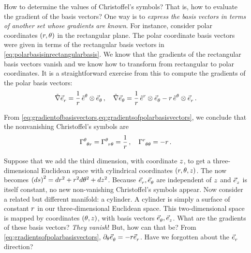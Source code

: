 How to determine the values of Christoffel's symbols? That is, how to evaluate the gradient of the basis vectors? One way is to \emph{express the basis vectors in terms of another set whose gradients are known}. For instance, consider polar coordinates $\tuple{\cxpos,\cypos}$ in the rectangular plane. The polar coordinate basis vectors were given in terms of the rectangular basis vectors in \cref{eq:polarbasisinrectangularbasis}. We know that the gradients of the rectangular basis vectors vanish and we know how to transform from rectangular to polar coordinates. It is a straightforward exercise from this to compute the gradients of the polar basis vectors:
%
\begin{equation}\label{eq:gradientsofpolarbasisvectors}
  \gradcov\tbvec\cxpos = \dfrac{1}{\cxpos}\,\tbcov\cypos\tprod\tbvec\cypos\,,\quad
  \gradcov\tbvec\cypos = \dfrac{1}{\cxpos}\,\tbcov\cxpos\tprod\tbvec\cypos 
                        - \cxpos\,\tbcov\cypos\tprod\tbvec\cxpos\,.
\end{equation}

From \cref{eq:gradientofbasisvectors,eq:gradientsofpolarbasisvectors}, we conclude that the nonvanishing Christoffel's symbols are
%
\begin{equation}\label{eq:christoffelsymbolspolarcoordinates}
  \tchris\cypos\cypos\cxpos = \tchris\cypos\cxpos\cypos
                            = \dfrac 1\cxpos\,,\quad
  \tchris\cxpos\cypos\cypos = -\cxpos\,.
\end{equation}

 Suppose that we add the third dimension, with coordinate $z$, to get a three-dimensional Euclidean space with cylindrical coordinates $\tuple{\cxpos,\cypos,\czpos}$. The  now becomes $\sqdifdist = d\cxpos^2 + \cxpos^2 d\cypos^2 + d\czpos^2$. Because $\tbvec\cxpos,\tbvec\cypos$ are independent of $z$ and $\tbvec\czpos$ is itself constant, no new non-vanishing Christoffel's symbols appear. Now consider a related but different manifold: a cylinder. A cylinder is simply a surface of constant $r$ in our three-dimensional Euclidean space. This two-dimensional space is mapped by coordinates $\tuple{\cypos,\czpos}$, with basis vectors $\tbvec\cypos,\tbvec\czpos$. What are the gradients of these basis vectors? \emph{They vanish}! But, how can that be? From \cref{eq:gradientsofpolarbasisvectors}, $\ipd\cypos\tbvec\cypos = -\cxpos\tbvec\cxpos$. Have we forgotten about the $\tbvec\cxpos$ direction?

